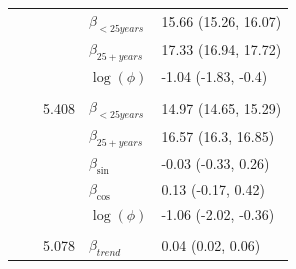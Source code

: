 \documentclass[a4paper,twoside,11pt]{report} %
\theoremstyle{definition}
\theoremstyle{definition}
\theoremstyle{definition}
\theoremstyle{definition}
\theoremstyle{remark}
\begin{document}
\begin{longtable}[t]{llrll}
\hspace{1em}\hspace{1em} &  &  & $\beta_{<25 years}$ & 15.66 (15.26, 16.07)\\

\hspace{1em}\hspace{1em} &  &  & $\beta_{25+ years}$ & 17.33 (16.94, 17.72)\\

\hspace{1em}\hspace{1em} &  &  & $\log(\phi)$ & -1.04 (-1.83, -0.4)\\
\cmidrule{2-5}
\addlinespace[0.3em]
\multicolumn{5}{l}{\begin{math}\log(\lambda_{it})=\beta(ageGroup_{i})+\beta_{\sin}\sin\Big(\frac{\pi\cdot \tau_{t}}{6}\Big) + \beta_{\cos} \cos\Big(\frac{\pi \cdot \tau_{t}}{6}\Big)+\log(n_{it})\end{math}}\\
\hspace{1em}\hspace{1em} &  & 5.408 & $\beta_{<25 years}$ & 14.97 (14.65, 15.29)\\

\hspace{1em}\hspace{1em} &  &  & $\beta_{25+ years}$ & 16.57 (16.3, 16.85)\\

\hspace{1em}\hspace{1em} &  &  & $\beta_{\sin}$ & -0.03 (-0.33, 0.26)\\

\hspace{1em}\hspace{1em} &  &  & $\beta_{\cos}$ & 0.13 (-0.17, 0.42)\\

\hspace{1em}\hspace{1em} &  &  & $\log(\phi)$ & -1.06 (-2.02, -0.36)\\
\cmidrule{2-5}
\addlinespace[0.3em]
\multicolumn{5}{l}{\begin{math}\log(\lambda_{it})=\beta(ageGroup_{i})+\beta_{trend} t + \beta_{\sin} \sin\Big(\frac{\pi\cdot \tau_{t}}{6}\Big) + \beta_{\cos} \cos\Big(\frac{\pi \cdot \tau_{t}}{6}\Big)+\log(n_{it})\end{math}}\\
\hspace{1em}\hspace{1em} &  & 5.078 & $\beta_{trend}$ & 0.04 (0.02, 0.06)\\


\end{longtable}
\end{document}
